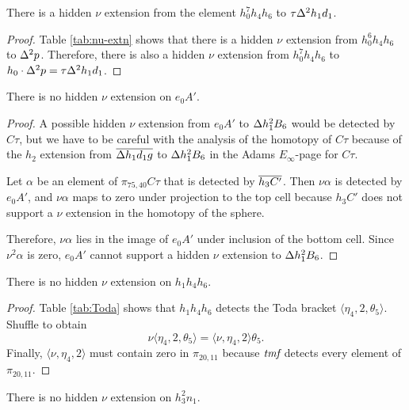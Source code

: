 \begin{lemma}
\label{lem:nu-h0^7h4h6}
There is a hidden $\nu$ extension from the element $h_0^7 h_4 h_6$ to
$\tau \Delta^2 h_1 d_1$.
\end{lemma}

\begin{proof}
Table \ref{tab:nu-extn} shows that there is a hidden
$\nu$ extension from $h_0^6 h_4 h_6$ to $\Delta^2 p$.
Therefore, there is also a hidden $\nu$ extension from
$h_0^7 h_4 h_6$ to $h_0 \cdot \Delta^2 p = \tau \Delta^2 h_1 d_1$.
\end{proof}

\begin{lemma}
\label{lem:nu-e0A'}
There is no hidden $\nu$ extension on $e_0 A'$.
\end{lemma}

\begin{proof}
A possible hidden $\nu$ extension from $e_0 A'$ to $\Delta h_1^2 B_6$
would be detected by $C\tau$, but we have to be careful with the
analysis of the homotopy of $C\tau$ because of the $h_2$ extension
from $\overline{\Delta h_1 d_1 g}$ to $\Delta h_1^2 B_6$ in the Adams
$E_\infty$-page for $C\tau$.

Let $\alpha$ be an element of $\pi_{75,40} C\tau$ that is detected
by $\overline{h_3 C'}$.  Then $\nu \alpha$ is detected by
$e_0 A'$, and $\nu \alpha$ maps to zero under projection to the 
top cell because $h_3 C'$ does not support a $\nu$ extension
in the homotopy of the sphere.

Therefore, $\nu \alpha$ lies in the image of 
$e_0 A'$ under inclusion of the bottom
cell.  Since $\nu^2 \alpha$ is zero, $e_0 A'$ cannot support
a hidden $\nu$ extension to $\Delta h_1^2 B_6$.
\end{proof}

\begin{lemma}
\label{lem:nu-h1h4h6}
There is no hidden $\nu$ extension on $h_1 h_4 h_6$.
\end{lemma}

\begin{proof}
Table \ref{tab:Toda} shows that $h_1 h_4 h_6$
detects the Toda bracket $\langle \eta_4, 2, \theta_5 \rangle$.
Shuffle to obtain
\[
\nu \langle \eta_4, 2, \theta_5 \rangle =
\langle \nu, \eta_4, 2 \rangle \theta_5.
\]
Finally, $\langle \nu, \eta_4, 2 \rangle$ must contain zero
in $\pi_{20,11}$ because $\textit{tmf}$ detects every element of
$\pi_{20,11}$.
\end{proof}

\begin{lemma}
\label{lem:nu-h3^2n1}
There is no hidden $\nu$ extension on $h_3^2 n_1$.
\end{lemma}

